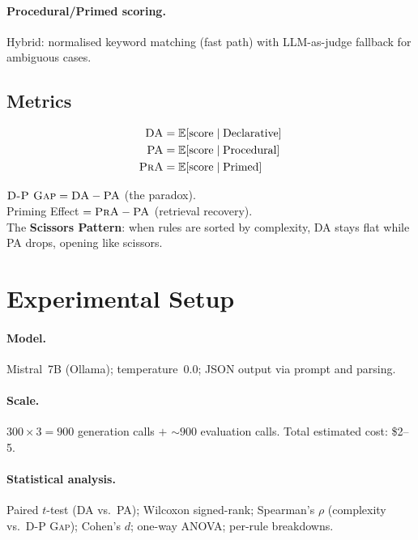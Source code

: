 \documentclass{article}
\newcommand{\dpgap}{\textsc{D-P Gap}}
\newcommand{\da}{\textsc{DA}}
\newcommand{\pa}{\textsc{PA}}
\newcommand{\pra}{\textsc{PrA}}
\begin{document}
\paragraph{Procedural/Primed scoring.}
Hybrid: normalised keyword matching (fast path) with LLM-as-judge
fallback for ambiguous cases.

\subsection{Metrics}

\begin{align*}
\da &= \mathbb{E}[\text{score} \mid \text{Declarative}] \\
\pa &= \mathbb{E}[\text{score} \mid \text{Procedural}] \\
\pra &= \mathbb{E}[\text{score} \mid \text{Primed}]
\end{align*}

\noindent
$\dpgap = \da - \pa$ (the paradox).\\
Priming Effect $= \pra - \pa$ (retrieval recovery).\\
The \textbf{Scissors Pattern}: when rules are sorted by complexity,
\da{} stays flat while \pa{} drops, opening like scissors.

\section{Experimental Setup}

\paragraph{Model.}
Mistral~7B (Ollama); temperature~0.0; JSON output via prompt and parsing.

\paragraph{Scale.}
$300 \times 3 = 900$ generation calls $+$ ${\sim}900$ evaluation
calls.
Total estimated cost: \$2--5.

\paragraph{Statistical analysis.}
Paired $t$-test (\da{} vs.\ \pa{}); Wilcoxon signed-rank;
Spearman's $\rho$ (complexity vs.\ \dpgap{});
Cohen's $d$; one-way ANOVA; per-rule breakdowns.
\end{document}
